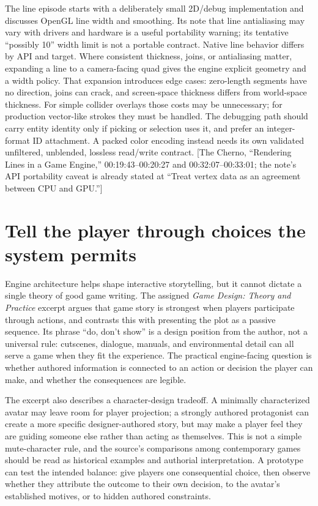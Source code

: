 The line episode starts with a deliberately small 2D/debug implementation and discusses OpenGL line width and smoothing. Its note that line antialiasing may vary with drivers and hardware is a useful portability warning; its tentative ``possibly 10'' width limit is not a portable contract. Native line behavior differs by API and target. Where consistent thickness, joins, or antialiasing matter, expanding a line to a camera-facing quad gives the engine explicit geometry and a width policy. That expansion introduces edge cases: zero-length segments have no direction, joins can crack, and screen-space thickness differs from world-space thickness. For simple collider overlays those costs may be unnecessary; for production vector-like strokes they must be handled. The debugging path should carry entity identity only if picking or selection uses it, and prefer an integer-format ID attachment. A packed color encoding instead needs its own validated unfiltered, unblended, lossless read/write contract. {[}The Cherno, ``Rendering Lines in a Game Engine,'' 00:19:43--00:20:27 and 00:32:07--00:33:01; the note's API portability caveat is already stated at ``Treat vertex data as an agreement between CPU and GPU.''{]}

\section{Tell the player through choices the system permits}\label{06-engine-ii-ch047-tell-the-player-through-choices-the-system-permits}

\hypertarget{06-engine-ii-ch047-tell-the-player-through-choices-the-system-permits}{}

Engine architecture helps shape interactive storytelling, but it cannot dictate a single theory of good game writing. The assigned \emph{Game Design: Theory and Practice} excerpt argues that game story is strongest when players participate through actions, and contrasts this with presenting the plot as a passive sequence. Its phrase ``do, don't show'' is a design position from the author, not a universal rule: cutscenes, dialogue, manuals, and environmental detail can all serve a game when they fit the experience. The practical engine-facing question is whether authored information is connected to an action or decision the player can make, and whether the consequences are legible.

The excerpt also describes a character-design tradeoff. A minimally characterized avatar may leave room for player projection; a strongly authored protagonist can create a more specific designer-authored story, but may make a player feel they are guiding someone else rather than acting as themselves. This is not a simple mute-character rule, and the source's comparisons among contemporary games should be read as historical examples and authorial interpretation. A prototype can test the intended balance: give players one consequential choice, then observe whether they attribute the outcome to their own decision, to the avatar's established motives, or to hidden authored constraints.

